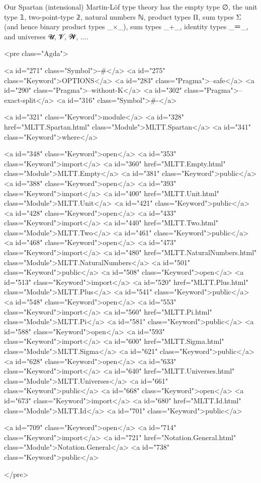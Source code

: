 Our Spartan (intensional) Martin-Löf type theory has the empty type ∅,
the unit type 𝟙, two-point-type 𝟚, natural numbers ℕ, product types Π,
sum types Σ (and hence binary product types _×_), sum types _+_,
identity types _＝_, and universes 𝓤, 𝓥, 𝓦, ....

<pre class="Agda">

<a id="271" class="Symbol">{-#</a> <a id="275" class="Keyword">OPTIONS</a> <a id="283" class="Pragma">--safe</a> <a id="290" class="Pragma">--without-K</a> <a id="302" class="Pragma">--exact-split</a> <a id="316" class="Symbol">#-}</a>

<a id="321" class="Keyword">module</a> <a id="328" href="MLTT.Spartan.html" class="Module">MLTT.Spartan</a> <a id="341" class="Keyword">where</a>

<a id="348" class="Keyword">open</a> <a id="353" class="Keyword">import</a> <a id="360" href="MLTT.Empty.html" class="Module">MLTT.Empty</a>           <a id="381" class="Keyword">public</a>
<a id="388" class="Keyword">open</a> <a id="393" class="Keyword">import</a> <a id="400" href="MLTT.Unit.html" class="Module">MLTT.Unit</a>            <a id="421" class="Keyword">public</a>
<a id="428" class="Keyword">open</a> <a id="433" class="Keyword">import</a> <a id="440" href="MLTT.Two.html" class="Module">MLTT.Two</a>             <a id="461" class="Keyword">public</a>
<a id="468" class="Keyword">open</a> <a id="473" class="Keyword">import</a> <a id="480" href="MLTT.NaturalNumbers.html" class="Module">MLTT.NaturalNumbers</a>  <a id="501" class="Keyword">public</a>
<a id="508" class="Keyword">open</a> <a id="513" class="Keyword">import</a> <a id="520" href="MLTT.Plus.html" class="Module">MLTT.Plus</a>            <a id="541" class="Keyword">public</a>
<a id="548" class="Keyword">open</a> <a id="553" class="Keyword">import</a> <a id="560" href="MLTT.Pi.html" class="Module">MLTT.Pi</a>              <a id="581" class="Keyword">public</a>
<a id="588" class="Keyword">open</a> <a id="593" class="Keyword">import</a> <a id="600" href="MLTT.Sigma.html" class="Module">MLTT.Sigma</a>           <a id="621" class="Keyword">public</a>
<a id="628" class="Keyword">open</a> <a id="633" class="Keyword">import</a> <a id="640" href="MLTT.Universes.html" class="Module">MLTT.Universes</a>       <a id="661" class="Keyword">public</a>
<a id="668" class="Keyword">open</a> <a id="673" class="Keyword">import</a> <a id="680" href="MLTT.Id.html" class="Module">MLTT.Id</a>              <a id="701" class="Keyword">public</a>

<a id="709" class="Keyword">open</a> <a id="714" class="Keyword">import</a> <a id="721" href="Notation.General.html" class="Module">Notation.General</a> <a id="738" class="Keyword">public</a>

</pre>
